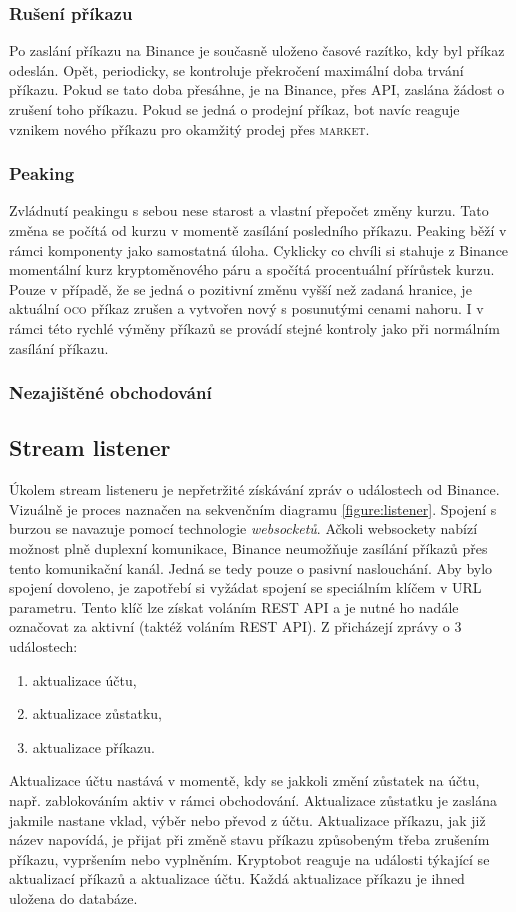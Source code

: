\subsubsection{Rušení příkazu}
Po zaslání příkazu na Binance je současně uloženo časové razítko, kdy byl příkaz odeslán. Opět, periodicky, se kontroluje překročení maximální doba trvání příkazu. Pokud se tato doba přesáhne,
je na Binance, přes API, zaslána žádost o zrušení toho příkazu. Pokud se jedná o prodejní příkaz, bot navíc reaguje vznikem nového příkazu pro okamžitý prodej přes \textsc{market}.

\subsubsection{Peaking}
Zvládnutí peakingu s sebou nese starost a vlastní přepočet změny kurzu. Tato změna se počítá od kurzu v momentě zasílání posledního příkazu. Peaking běží v rámci komponenty jako samostatná úloha.
Cyklicky co chvíli si stahuje z Binance momentální kurz kryptoměnového páru a spočítá procentuální přírůstek kurzu. Pouze v případě, že se jedná o pozitivní změnu vyšší než zadaná hranice, je
aktuální \textsc{oco} příkaz zrušen a vytvořen nový s posunutými cenami nahoru. I v rámci této rychlé výměny příkazů se provádí stejné kontroly jako při normálním zasílání příkazu.

\subsubsection{Nezajištěné obchodování}

\subsection{Stream listener}
Úkolem stream listeneru je nepřetržité získávání zpráv o událostech od Binance. Vizuálně je proces naznačen na sekvenčním diagramu \ref{figure:listener}.
Spojení s burzou se navazuje pomocí technologie \emph{websocketů}. Ačkoli websockety nabízí možnost plně duplexní komunikace, Binance
neumožňuje zasílání příkazů přes tento komunikační kanál. Jedná se tedy pouze o pasivní naslouchání. Aby bylo spojení dovoleno, je zapotřebí si vyžádat spojení se speciálním klíčem v URL parametru.
Tento klíč lze získat voláním REST API a je nutné ho nadále označovat za aktivní (taktéž voláním REST API). Z přicházejí zprávy o 3 událostech:
\begin{enumerate}
    \item aktualizace účtu,
    \item aktualizace zůstatku,
    \item aktualizace příkazu.
\end{enumerate}
Aktualizace účtu nastává v momentě, kdy se jakkoli změní zůstatek na účtu, např. zablokováním aktiv v rámci obchodování. Aktualizace zůstatku je zaslána jakmile nastane vklad, výběr nebo převod z účtu.
Aktualizace příkazu, jak již název napovídá, je přijat při změně stavu příkazu způsobeným třeba zrušením příkazu, vypršením nebo vyplněním. Kryptobot reaguje na události týkající se aktualizací příkazů
a aktualizace účtu. Každá aktualizace příkazu je ihned uložena do databáze.

